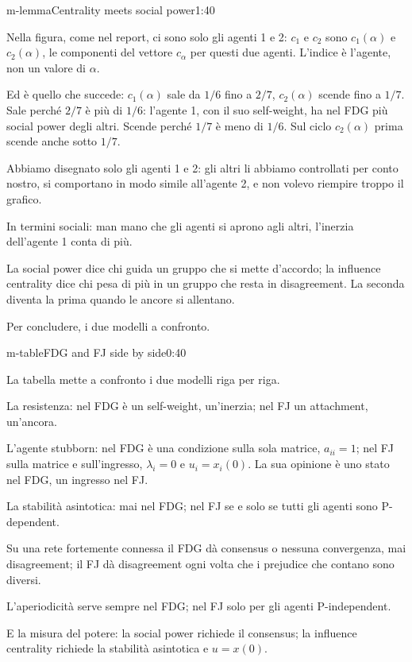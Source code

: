 \begin{slidetre}{m-lemma}{Centrality meets social power}{1:40}
\begin{discorso}
    \item \clic Nella figura, come nel report, ci sono solo gli agenti 1 e 2: $c_1$ e $c_2$ sono $c_1(\alpha)$ e $c_2(\alpha)$, le componenti del vettore $c_\alpha$ per questi due agenti. L'indice è l'agente, non un valore di $\alpha$.
    \item Ed è quello che succede: $c_1(\alpha)$ sale da $1/6$ fino a $2/7$, $c_2(\alpha)$ scende fino a $1/7$. Sale perché $2/7$ è più di $1/6$: l'agente 1, con il suo self-weight, ha nel FDG più social power degli altri. Scende perché $1/7$ è meno di $1/6$. Sul ciclo $c_2(\alpha)$ prima scende anche sotto $1/7$.
    \item Abbiamo disegnato solo gli agenti 1 e 2: gli altri li abbiamo controllati per conto nostro, si comportano in modo simile all'agente 2, e non volevo riempire troppo il grafico.
    \item In termini sociali: man mano che gli agenti si aprono agli altri, l'inerzia dell'agente 1 conta di più.
    \item La social power dice chi guida un gruppo che si mette d'accordo; la influence centrality dice chi pesa di più in un gruppo che resta in disagreement. La seconda diventa la prima quando le ancore si allentano.
    \item Per concludere, i due modelli a confronto.
  \end{discorso}
\end{slidetre}


\begin{slide}{m-table}{FDG and FJ side by side}{0:40}
  \begin{discorso}
    \item La tabella mette a confronto i due modelli riga per riga.
    \item La resistenza: nel FDG è un self-weight, un'inerzia; nel FJ un attachment, un'ancora.
    \item L'agente stubborn: nel FDG è una condizione sulla sola matrice, $a_{ii}=1$; nel FJ sulla matrice e sull'ingresso, $\lambda_i=0$ e $u_i=x_i(0)$. La sua opinione è uno stato nel FDG, un ingresso nel FJ.
    \item La stabilità asintotica: mai nel FDG; nel FJ se e solo se tutti gli agenti sono P-dependent.
    \item Su una rete fortemente connessa il FDG dà consensus o nessuna convergenza, mai disagreement; il FJ dà disagreement ogni volta che i prejudice che contano sono diversi.
    \item L'aperiodicità serve sempre nel FDG; nel FJ solo per gli agenti P-independent.
    \item E la misura del potere: la social power richiede il consensus; la influence centrality richiede la stabilità asintotica e $u=x(0)$.
  \end{discorso}
\end{slide}

